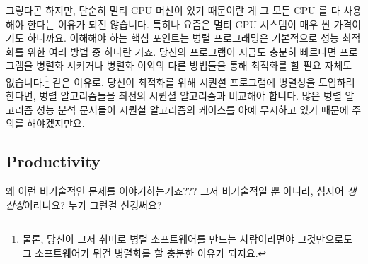 그렇다곤 하지만, 단순히 멀티 CPU 머신이 있기 때문이란 게 그 모든 CPU 를 다
사용해야 한다는 이유가 되진 않습니다. 특히나 요즘은 멀티 CPU 시스템이 매우 싼
가격이기도 하니까요.
이해해야 하는 핵심 포인트는 병렬 프로그래밍은 기본적으로 성능 최적화를 위한
여러 방법 중 하나란 거죠.
당신의 프로그램이 지금도 충분히 빠르다면 프로그램을 병렬화 시키거나 병렬화
이외의 다른 방법들을 통해 최적화를 할 필요 자체도 없습니다.\footnote{
	물론, 당신이 그저 취미로 병렬 소프트웨어를 만드는 사람이라면야
	그것만으로도 그 소프트웨어가 뭐건 병렬화를 할 충분한 이유가 되지요.}
같은 이유로, 당신이 최적화를 위해 시퀀셜 프로그램에 병렬성을 도입하려 한다면,
병렬 알고리즘들을 최선의 시퀀셜 알고리즘과 비교해야 합니다.
많은 병렬 알고리즘 성능 분석 문서들이 시퀀셜 알고리즘의 케이스를 아예
무시하고 있기 때문에 주의를 해야겠지만요.


\subsection{Productivity}
\label{sec:intro:Productivity}

\QuickQuiz{}
	왜 이런 비기술적인 문제를 이야기하는거죠???
	그저 비기술적일 뿐 아니라, 심지어 \emph{생산성}이라니요?
	누가 그런걸 신경써요?

